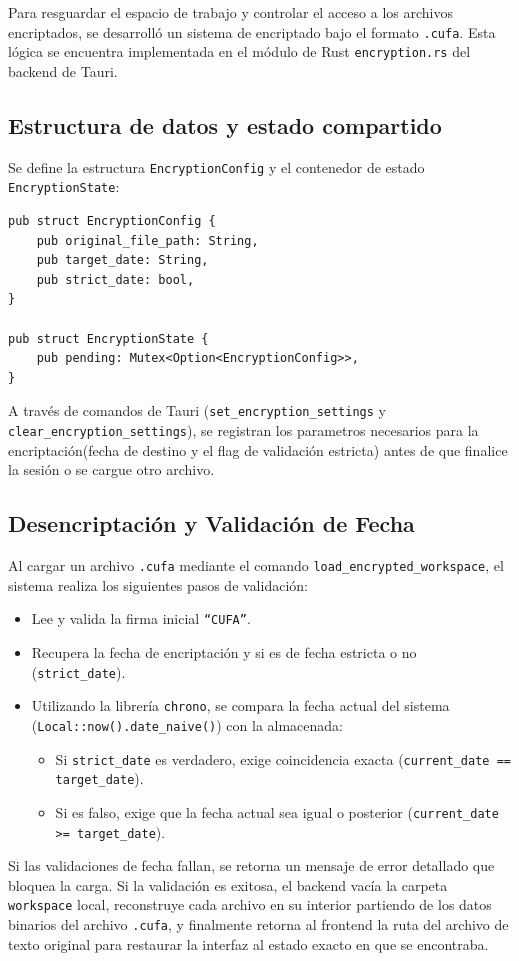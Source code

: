 Para resguardar el espacio de trabajo y controlar el acceso a los archivos encriptados, se desarrolló un sistema de encriptado bajo el formato \texttt{.cufa}. Esta lógica se encuentra implementada en el módulo de Rust \texttt{encryption.rs} del backend de Tauri.

\subsection*{Estructura de datos y estado compartido}

Se define la estructura \texttt{EncryptionConfig} y el contenedor de estado \texttt{EncryptionState}:

\begin{verbatim}
pub struct EncryptionConfig {
    pub original_file_path: String,
    pub target_date: String,
    pub strict_date: bool,
}

pub struct EncryptionState {
    pub pending: Mutex<Option<EncryptionConfig>>,
}
\end{verbatim}

A través de comandos de Tauri (\texttt{set\_encryption\_settings} y \texttt{clear\_encryption\_settings}), se registran los parametros necesarios para la encriptación(fecha de destino y el flag de validación estricta) antes de que finalice la sesión o se cargue otro archivo.

\subsection*{Desencriptación y Validación de Fecha}

Al cargar un archivo \texttt{.cufa} mediante el comando \texttt{load\_encrypted\_workspace}, el sistema realiza los siguientes pasos de validación:
\begin{itemize}
    \item Lee y valida la firma inicial \texttt{``CUFA''}.
    \item Recupera la fecha de encriptación y si es de fecha estricta o no (\texttt{strict\_date}).
    \item Utilizando la librería \texttt{chrono}, se compara la fecha actual del sistema (\texttt{Local::now().date\_naive()}) con la almacenada:
    \begin{itemize}
        \item Si \texttt{strict\_date} es verdadero, exige coincidencia exacta (\texttt{current\_date == target\_date}).
        \item Si es falso, exige que la fecha actual sea igual o posterior (\texttt{current\_date >= target\_date}).
    \end{itemize}
\end{itemize}

Si las validaciones de fecha fallan, se retorna un mensaje de error detallado que bloquea la carga. Si la validación es exitosa, el backend vacía la carpeta \texttt{workspace} local, reconstruye cada archivo en su interior partiendo de los datos binarios del archivo \texttt{.cufa}, y finalmente retorna al frontend la ruta del archivo de texto original para restaurar la interfaz al estado exacto en que se encontraba. 